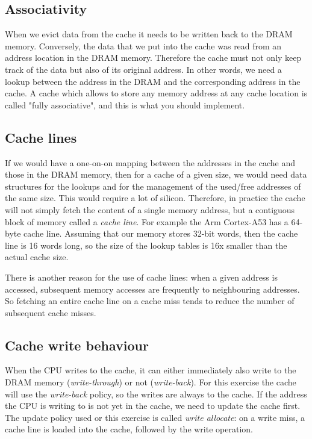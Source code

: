 \documentclass[11pt]{article}
\begin{document}
 \subsection{Associativity}
 
When we evict data from the cache it needs to be written back to the DRAM memory. Conversely, the data that we put into the cache was read from an address location in the DRAM memory. Therefore the cache must not only keep track of the data but also of its original address. In other words, we need a lookup between the address in the DRAM and the corresponding address in the cache. A cache which allows to store any memory address at any cache location  is called "fully associative", and this is what you should implement.
 
  \subsection{Cache lines}
If we would have a one-on-on mapping between the addresses in the cache and those in the DRAM memory, then for a cache of  a given size, we would need data structures for the lookups and for the management of the used/free addresses of the same size. This would require a lot of silicon. Therefore, in practice the cache will not simply fetch the content of a single memory address, but a contiguous block of memory called a \emph{cache line}. For example the Arm Cortex-A53 has a 64-byte cache line. Assuming that our memory stores 32-bit words, then the cache line is 16 words long, so the size of the  lookup tables is 16x smaller than the actual cache size. 

There is another reason for the use of cache lines: when a given address is accessed, subsequent memory accesses are frequently to neighbouring addresses. So fetching an entire cache line on a cache miss tends to reduce the number of subsequent cache misses. 

 \subsection{Cache write behaviour}
 
 When the CPU writes to the cache, it can either immediately also write to the DRAM memory (\emph{write-through}) or not (\emph{write-back}). For this exercise the cache will use the \emph{write-back} policy, so the writes are always to the cache. If the address the CPU is writing to is not yet in the cache, we need to update the cache first.  The  update policy used or this exercise  is called \emph{write allocate}: on a write miss, a cache line is loaded into the cache, followed by the write operation.
\end{document}

